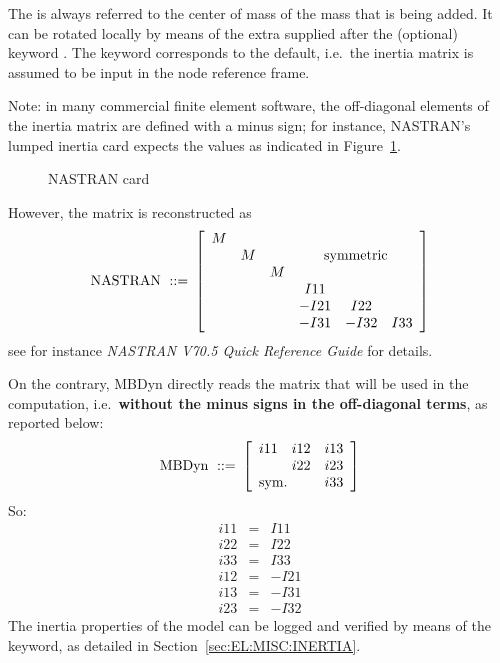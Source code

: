 The  is always referred to the center of mass of the
mass that is being added. It can be rotated locally by means of the extra
 supplied after the (optional) keyword .
The keyword  corresponds to the default, i.e.\ the inertia matrix
is assumed to be input in the node reference frame.

Note: in many commercial finite element software, the off-diagonal elements 
of the inertia matrix are defined with a minus sign; for instance, 
NASTRAN's  lumped inertia card expects the values as indicated
in Figure~\ref{fig:el:body:CONM2}.
%
\begin{figure}[b]
\centering
\begin{minipage}{120mm}
\end{minipage}
\caption{NASTRAN  card}
\label{fig:el:body:CONM2}
\end{figure}
%
However, the matrix is reconstructed as
\begin{displaymath}
	\mathrm{NASTRAN \ ::= } \ \sqbr{\matr{cccccc}{
		M & & & & & \\
		& M & & \multicolumn{3}{c}{\mathrm{symmetric}} \\
		& & M & & & \\
		& & & I11 & & \\
		& & & -I21 & I22 & \\
		& & & -I31 & -I32 & I33
	}}
\end{displaymath}
see for instance \emph{NASTRAN V70.5 Quick Reference Guide} for details.

\noindent
On the contrary, MBDyn directly reads the matrix 
that will be used in the computation, i.e.\ 
\textbf{without the minus signs in the off-diagonal terms},
as reported below:
\begin{displaymath}
	\mathrm{MBDyn \ ::= } \ \sqbr{\matr{ccc}{
		i11 & i12 & i13 \\
		& i22 & i23 \\
		\multicolumn{2}{l}{\mathrm{sym.}} & i33
	}}
\end{displaymath}
So:
\begin{eqnarray*}
	i11 & = & I11 \\
	i22 & = & I22 \\
	i33 & = & I33 \\
	i12 & = & - I21 \\
	i13 & = & - I31 \\
	i23 & = & - I32
\end{eqnarray*}
The inertia properties of the model can be logged and verified
by means of the  keyword, as detailed
in Section~\ref{sec:EL:MISC:INERTIA}.

